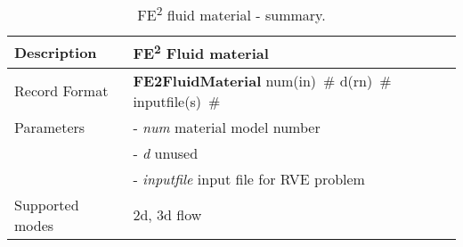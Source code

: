 \documentclass[a4paper]{article}
\newcommand{\descitem}[1]{{\noindent \bf #1}}
\newcommand{\elemparam}[2]{{{#1\tiny (#2)}~\#}}
\newcommand{\param}[1]{{\it #1}}
\newenvironment{mmt}{\begin{tabular}{|l|p{9cm}|}}{\end{tabular}\\}
\newenvironment{mmt}{\begin{tabular}{|l|l|}}{\end{tabular}\\}
\begin{document}
\begin{table}[!htb]
\centering
\begin{mmt}
\hline
Description & FE\textsuperscript{2} Fluid material\\
\hline
Record Format  & \descitem{FE2FluidMaterial} \elemparam{num}{in} \elemparam{d}{rn} \elemparam{inputfile}{s}\\
Parameters &- \param{num}       material model number\\
           &- \param{d}         unused\\
           &- \param{inputfile} input file for RVE problem\\
Supported modes&  2d, 3d flow\\
\hline
\end{mmt}
\caption{FE\textsuperscript{2} fluid material - summary.}
\label{FE2FluidMaterial_table}
\end{table}

\clearpage
\end{document}
